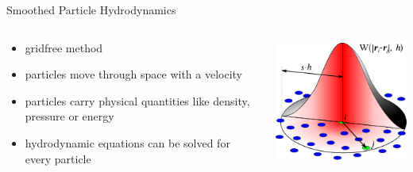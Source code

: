 \documentclass{beamer}
\begin{document}
\begin{frame}{Smoothed Particle Hydrodynamics}
\begin{columns}
	\begin{column}{0.55\textwidth}
		\begin{itemize}
			\item gridfree method
			\item particles move through space with a velocity
			\item particles carry physical quantities like density, pressure or energy
			\item hydrodynamic equations can be solved for every particle
		\end{itemize}
	\end{column}
	\begin{column}{0.4\textwidth}
	\vspace{\topsep}	
	\includegraphics[width=\columnwidth]{sph_method.png}
	\end{column}
\end{columns}
\end{frame}
\end{document}
